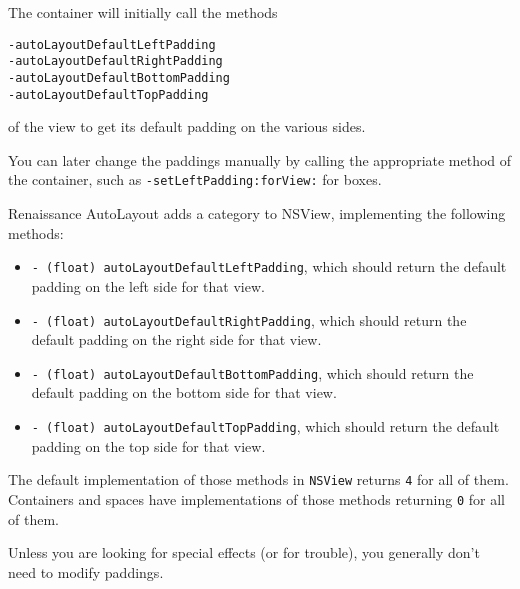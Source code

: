 The container will initially call the methods
\begin{verbatim}
-autoLayoutDefaultLeftPadding
-autoLayoutDefaultRightPadding
-autoLayoutDefaultBottomPadding
-autoLayoutDefaultTopPadding
\end{verbatim}
of the view to get its default padding on the various sides.

You can later change the paddings manually by calling the appropriate
method of the container, such as \texttt{-setLeftPadding:forView:} for
boxes.

Renaissance AutoLayout adds a category to NSView, implementing the
following methods:

\begin{itemize}
\item \texttt{- (float) autoLayoutDefaultLeftPadding}, which should
return the default padding on the left side for that view.
\item \texttt{- (float) autoLayoutDefaultRightPadding}, which should
return the default padding on the right side for that view.
\item \texttt{- (float) autoLayoutDefaultBottomPadding}, which should
return the default padding on the bottom side for that view.
\item \texttt{- (float) autoLayoutDefaultTopPadding}, which should
return the default padding on the top side for that view.
\end{itemize}

The default implementation of those methods in \texttt{NSView} returns
\texttt{4} for all of them.  Containers and spaces have
implementations of those methods returning \texttt{0} for all of them.

Unless you are looking for special effects (or for trouble), you
generally don't need to modify paddings.

